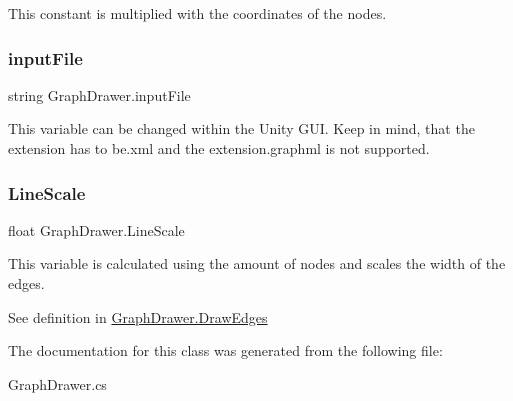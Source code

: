 This constant is multiplied with the coordinates of the nodes. 

\mbox{\label{class_graph_drawer_a1264583a4ab9461d51c53c78ca12c5fa}} 
\subsubsection{\texorpdfstring{inputFile}{inputFile}}
{\footnotesize\ttfamily string Graph\+Drawer.\+input\+File}



This variable can be changed within the Unity G\+UI. Keep in mind, that the extension has to be.\+xml and the extension.\+graphml is not supported. 

\mbox{\label{class_graph_drawer_aa5ef4a330d302c0d55a33376a4727edf}} 
\subsubsection{\texorpdfstring{LineScale}{LineScale}}
{\footnotesize\ttfamily float Graph\+Drawer.\+Line\+Scale}



This variable is calculated using the amount of nodes and scales the width of the edges. 

See definition in \mbox{\hyperlink{class_graph_drawer_ad4bde4b9d817629c77bc1e8818e5cd69}{Graph\+Drawer.\+Draw\+Edges}} 

The documentation for this class was generated from the following file\+:\begin{DoxyCompactItemize}
\item 
Graph\+Drawer.\+cs\end{DoxyCompactItemize}
